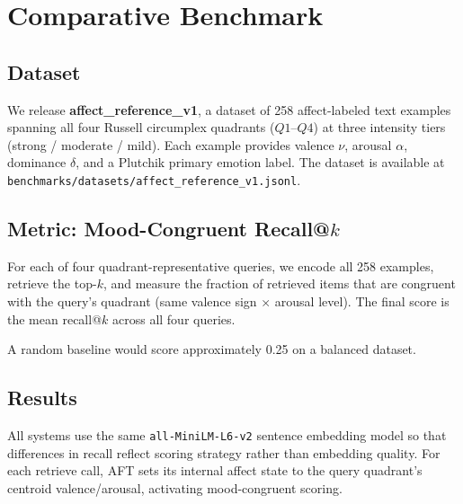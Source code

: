 \documentclass[11pt]{article}
\begin{document}
\section{Comparative Benchmark}
\label{sec:benchmark}

\subsection{Dataset}

We release \textbf{affect\_reference\_v1}, a dataset of 258 affect-labeled text
examples spanning all four Russell circumplex quadrants ($Q1$--$Q4$) at three
intensity tiers (strong / moderate / mild). Each example provides valence
$\nu$, arousal $\alpha$, dominance $\delta$, and a Plutchik primary emotion
label. The dataset is available at
\texttt{benchmarks/datasets/affect\_reference\_v1.jsonl}.

\subsection{Metric: Mood-Congruent Recall@$k$}

For each of four quadrant-representative queries, we encode all 258 examples,
retrieve the top-$k$, and measure the fraction of retrieved items that are
congruent with the query's quadrant (same valence sign $\times$ arousal level).
The final score is the mean recall@$k$ across all four queries.

A random baseline would score approximately 0.25 on a balanced dataset.

\subsection{Results}

All systems use the same \texttt{all-MiniLM-L6-v2} sentence embedding model
so that differences in recall reflect scoring strategy rather than embedding
quality. For each retrieve call, AFT sets its internal affect state to the
query quadrant's centroid valence/arousal, activating mood-congruent scoring.

\begin{table}[ht]
\centering
\caption{Comparative benchmark results (recall@5, $n=258$, embedder:
\texttt{all-MiniLM-L6-v2}). Regenerate with \texttt{make bench-comparative-sbert \&\& make reproduce-paper}.}
\label{tab:comparative}

\end{table}
\end{document}
